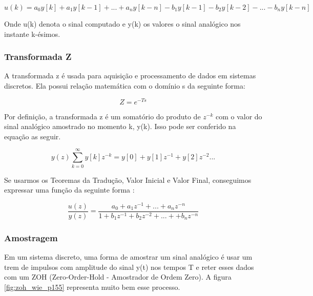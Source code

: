 \begin{equation}
  u(k) = a_{0}y[k]+a_{1}y[k-1]+...+a_{n}y[k-n] - b_{1}y[k-1] - b_{2}y[k-2] - ... -b_{n}y[k-n]
\end{equation}

Onde u(k) denota o sinal computado e y(k) os valores o sinal analógico nos instante k-ésimos.


\subsubsection{Transformada Z}

A transformada z é usada para aquisição e processamento de dados em sistemas discretos. Ela possui relação matemática com o domínio s da seguinte forma:

\begin{equation}
Z = e^{-Ts}
\end{equation}

Por definição, a transformada z é um somatório do produto de $z^{-k}$ com o valor do sinal analógico amostrado no momento k, y(k). Isso pode ser conferido na equação as seguir.

\begin{equation}
  y(z) \sum_{k=0}^{\infty}{y[k]z^{-k}} = y[0] + y[1]z^{-1}+y[2]z^{-2}...
 \end{equation} 

 Se usarmos os Teoremas da Tradução, Valor Inicial e Valor Final, conseguimos expressar uma função da seguinte forma \cite{BongWie2001}:

\begin{equation}
  \frac{u(z)}{y(z)} = \frac{a_0 + a_1z^{-1}+...+a_nz^{-n}}{1+b_1z^{-1}+b_2z^{-2}+...++b_nz^{-n}}
\end{equation}


\subsubsection{Amostragem}

Em um sistema discreto, uma forma de amostrar um sinal analógico é usar um trem de impulsos com amplitude do sinal y(t) nos tempos T e reter esses dados com um ZOH (Zero-Order-Hold - Amostrador de Ordem Zero). A figura \ref{fig:zoh_wie_p155} representa muito bem esse processo.

